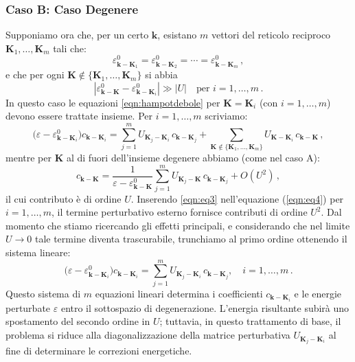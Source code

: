 \subsubsection{Caso B: Caso Degenere}
Supponiamo ora che, per un certo \(\mathbf{k}\), esistano \(m\) vettori del reticolo reciproco \(\mathbf{K}_1, \ldots, \mathbf{K}_m\) tali che:
\[
\varepsilon^0_{\mathbf{k}-\mathbf{K}_1} = \varepsilon^0_{\mathbf{k}-\mathbf{K}_2} = \cdots = \varepsilon^0_{\mathbf{k}-\mathbf{K}_m}\,,
\]
e che per ogni \(\mathbf{K} \not\in \{\mathbf{K}_1, \ldots, \mathbf{K}_m\}\) si abbia
\[
|\varepsilon^0_{\mathbf{k}-\mathbf{K}} - \varepsilon^0_{\mathbf{k}-\mathbf{K}_i}| \gg |U| \quad \text{per } i=1,\ldots,m\,.
\]
In questo caso le equazioni \eqref{eqn:hampotdebole} per \( \mathbf{K} = \mathbf{K}_i\) (con \(i=1,\ldots,m\)) devono essere trattate insieme.  
Per \(i=1,\ldots,m\) scriviamo:
\begin{equation}
\bigl(\varepsilon - \varepsilon^0_{\mathbf{k}-\mathbf{K}_i}\bigr)c_{\mathbf{k}-\mathbf{K}_i} = \sum_{j=1}^{m} U_{\mathbf{K}_j-\mathbf{K}_i}\, c_{\mathbf{k}-\mathbf{K}_j} + \sum_{\mathbf{K} \notin \{\mathbf{K}_1,\ldots,\mathbf{K}_m\}} U_{\mathbf{K}-\mathbf{K}_i}\, c_{\mathbf{k}-\mathbf{K}}\,,
\label{eqn:eq4}
\end{equation}
mentre per \(\mathbf{K}\) al di fuori dell'insieme degenere abbiamo (come nel caso A):
\begin{equation}
c_{\mathbf{k}-\mathbf{K}} = \frac{1}{\varepsilon - \varepsilon^0_{\mathbf{k}-\mathbf{K}}} \sum_{j=1}^{m} U_{\mathbf{K}_j-\mathbf{K}}\, c_{\mathbf{k}-\mathbf{K}_j} + O(U^2)\,,
\label{eqn:eq3}
\end{equation}
il cui contributo è di ordine \(U\).  
Inserendo \eqref{eqn:eq3} nell'equazione (\ref{eqn:eq4}) per \(i=1,\ldots,m\), il termine perturbativo esterno fornisce contributi di ordine \(U^2\).  
Dal momento che stiamo ricercando gli effetti principali, e considerando che nel limite \(U\to 0\) tale termine diventa trascurabile, trunchiamo al primo ordine ottenendo il sistema lineare:
\begin{equation}
\bigl(\varepsilon - \varepsilon^0_{\mathbf{k}-\mathbf{K}_i}\bigr) c_{\mathbf{k}-\mathbf{K}_i} = \sum_{j=1}^{m} U_{\mathbf{K}_j-\mathbf{K}_i}\, c_{\mathbf{k}-\mathbf{K}_j}, \quad i=1,\ldots,m\,.
\label{eqn:eq6}
\end{equation}
Questo sistema di \(m\) equazioni lineari determina i coefficienti \(c_{\mathbf{k}-\mathbf{K}_i}\) e le energie perturbate \(\varepsilon\) entro il sottospazio di degenerazione.  
L'energia risultante subirà uno spostamento del secondo ordine in \(U\); tuttavia, in questo trattamento di base, il problema si riduce alla diagonalizzazione della matrice perturbativa \(U_{\mathbf{K}_j-\mathbf{K}_i}\) al fine di determinare le correzioni energetiche.

